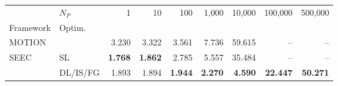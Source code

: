 \begin{tabular}{llrrrrrrr}
\toprule
 & $N_P$ & 1 & 10 & 100 & 1,000 & 10,000 & 100,000 & 500,000 \\
Framework & Optim. &  &  &  &  &  &  &  \\
\midrule
MOTION~\cite{BDST22} &  & 3.230 & 3.322 & 3.561 & 7.736 & 59.615 & -- & -- \\
\cline{1-9}
\multirow[c]{2}{*}{SEEC} & SL & \bfseries 1.768 & \bfseries 1.862 & 2.785 & 5.557 & 35.484 & -- & -- \\
 & DL/IS/FG & 1.893 & 1.894 & \bfseries 1.944 & \bfseries 2.270 & \bfseries 4.590 & \bfseries 22.447 & \bfseries 50.271 \\
\bottomrule
\end{tabular}

